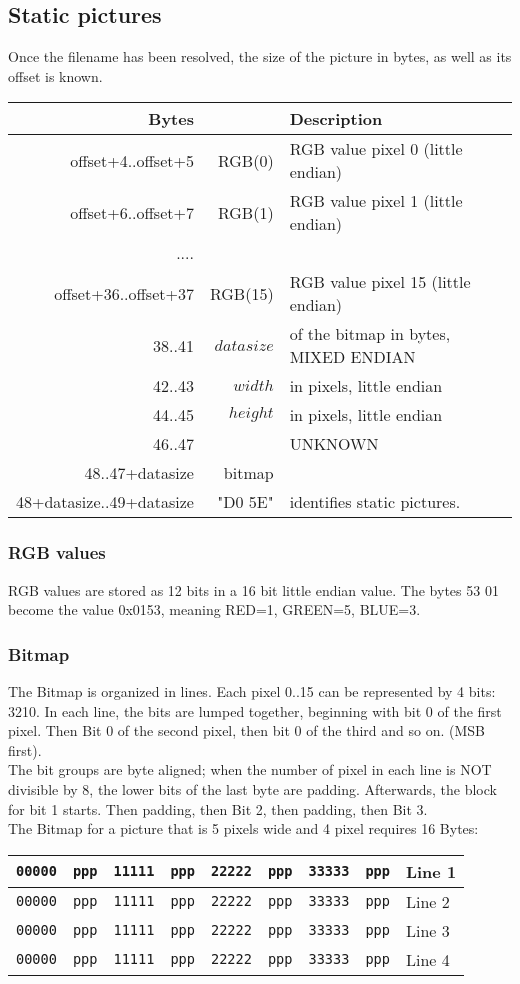 \documentclass[11pt,twoside,openright]{report}
\begin{document}
\subsection{Static pictures}
Once the filename has been resolved, the size of the picture in bytes, as well as its offset is known.\\
\begin{tabular}{r|rl}
Bytes&&Description\\\hline
offset+4..offset+5&RGB(0)&RGB value pixel 0 (little endian)\\
offset+6..offset+7&RGB(1)&RGB value pixel 1 (little endian)\\
....&&\\
offset+36..offset+37&RGB(15)&RGB value pixel 15 (little endian)\\\hline
38..41&$datasize$& of the bitmap in bytes, MIXED ENDIAN\\
42..43&$width$& in pixels, little endian\\
44..45&$height$& in pixels, little endian\\
46..47&&UNKNOWN\\
48..47+datasize&bitmap\\\hline
48+datasize..49+datasize&"D0 5E"&identifies static pictures.
\end{tabular}
\subsubsection{RGB values}
RGB values are stored as 12 bits in a 16 bit little endian value.
The bytes 53 01 become the value 0x0153, meaning RED=1, GREEN=5, BLUE=3.\\
\subsubsection{Bitmap}
The Bitmap is organized in lines. Each pixel 0..15 can be represented by 4 bits: 3210. In each line, the bits are lumped together, beginning with bit 0 of the first pixel. Then Bit 0 of the second pixel, then bit 0 of the third and so on. (MSB first).\\
The bit groups are byte aligned; when the number of pixel in each line is NOT divisible by 8, the lower bits of the last byte are padding. Afterwards, the block for bit 1 starts. Then padding, then Bit 2, then padding, then Bit 3.\\

The Bitmap for a picture that is 5 pixels wide and 4 pixel requires 16 Bytes:\\
\begin{tabular}{ll|ll|ll|lll}
{\tt 00000}&{\tt ppp}&{\tt 11111}&{\tt ppp}&{\tt 22222}&{\tt ppp}&{\tt 33333}&{\tt ppp}&Line 1\\\hline
{\tt 00000}&{\tt ppp}&{\tt 11111}&{\tt ppp}&{\tt 22222}&{\tt ppp}&{\tt 33333}&{\tt ppp}&Line 2\\\hline
{\tt 00000}&{\tt ppp}&{\tt 11111}&{\tt ppp}&{\tt 22222}&{\tt ppp}&{\tt 33333}&{\tt ppp}&Line 3\\\hline
{\tt 00000}&{\tt ppp}&{\tt 11111}&{\tt ppp}&{\tt 22222}&{\tt ppp}&{\tt 33333}&{\tt ppp}&Line 4\\
\end{tabular}
\end{document}
